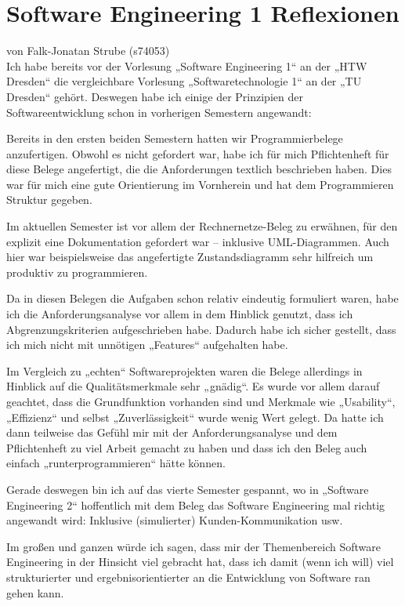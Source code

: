 \documentclass[a4paper,20pt]{scrartcl}
\title{\customTitle}
\author{\customAuthor}
\providecommand{\customTitle}{Software Engineering 1 Reflexionen}
\begin{document}
\section*{\customTitle}
\vspace*{-0.74cm}
von Falk-Jonatan Strube (s74053)\vspace*{0.5cm}\\
Ich habe bereits vor der Vorlesung „Software Engineering 1“ an der „HTW Dresden“ die vergleichbare Vorlesung „Softwaretechnologie 1“ an der „TU Dresden“ gehört. Deswegen habe ich einige der Prinzipien der Softwareentwicklung schon in vorherigen Semestern angewandt:

Bereits in den ersten beiden Semestern hatten wir Programmierbelege anzufertigen. Obwohl es nicht gefordert war, habe ich für mich Pflichtenheft für diese Belege angefertigt, die die Anforderungen textlich beschrieben haben. Dies war für mich eine gute Orientierung im Vornherein und hat dem Programmieren Struktur gegeben.

Im aktuellen Semester ist vor allem der Rechnernetze-Beleg zu erwähnen, für den explizit eine Dokumentation gefordert war -- inklusive UML-Diagrammen. Auch hier war beispielsweise das angefertigte Zustandsdiagramm sehr hilfreich um produktiv zu programmieren.

Da in diesen Belegen die Aufgaben schon relativ eindeutig formuliert waren, habe ich die Anforderungsanalyse vor allem in dem Hinblick genutzt, dass ich  Abgrenzungskriterien aufgeschrieben habe. Dadurch habe ich sicher gestellt, dass ich mich nicht mit unnötigen „Features“ aufgehalten habe.

Im Vergleich zu „echten“ Softwareprojekten waren die Belege allerdings in Hinblick auf die Qualitätsmerkmale sehr „gnädig“. Es wurde vor allem darauf geachtet, dass die Grundfunktion vorhanden sind und Merkmale wie „Usability“, „Effizienz“ und selbst „Zuverlässigkeit“ wurde wenig Wert gelegt. Da hatte ich dann teilweise das Gefühl mir mit der Anforderungsanalyse und dem Pflichtenheft zu viel Arbeit gemacht zu haben und dass ich den Beleg auch einfach „runterprogrammieren“ hätte können.

Gerade deswegen bin ich auf das vierte Semester gespannt, wo in „Software Engineering 2“ hoffentlich mit dem Beleg das Software Engineering mal richtig angewandt wird: Inklusive (simulierter) Kunden-Kommunikation usw.

Im großen und ganzen würde ich sagen, dass mir der Themenbereich Software Engineering in der Hinsicht viel gebracht hat, dass ich damit (wenn ich will) viel strukturierter und ergebnisorientierter an die Entwicklung von Software ran gehen kann.
\end{document}
